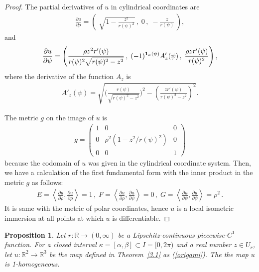 \documentclass{amsart}
\theoremstyle{plain}
\newtheorem{proposition}[theorem]{Proposition}
\theoremstyle{definition}
\theoremstyle{remark}
\begin{document}
\begin{proof}%
The partial derivatives of $u$ in cylindrical coordinates are
\begin{align*}
\frac{\partial u}{\partial\rho}=\left(\;\sqrt{1-\frac{z^2}{r(\psi)^2}}\,,\;0\,,\;-\frac{z}{r(\psi)}\,\right),
\end{align*}
and
\begin{align*}
\frac{\partial u}{\partial\psi}=\left(\frac{\rho z^2r'(\psi)}{r(\psi)^2\sqrt{r(\psi)^2-z^2}}\,,\;(-1)^{\bold{1}_{\kappa}(\psi)}A'_z(\psi)\,,\;\frac{\rho zr'(\psi)}{r(\psi)^2}\right),
\end{align*}
where the derivative of the function $A_z$ is
\begin{align*}
A'_z(\psi)=\sqrt{\biggl(\frac{r(\psi)}{\sqrt{r(\psi)^2-z^2}}\biggr)^2-\left(\frac{zr'(\psi)}{r(\psi)^2-z^2}\right)^2}.
\end{align*}

The metric $g$ on the image of $u$ is
\begin{align*}
g=\begin{pmatrix}1&0&0\\0&\rho^2\left(1- {z^2}/{r(\psi)^2}\right)&0\\0&0&1\end{pmatrix}
\end{align*}
because the codomain of $u$ was given in the cylindrical coordinate system.
Then, we have a calculation of the first fundamental form with the inner product in the metric $g$ as follows:
\begin{align*}
E=\left\langle\frac{\partial u}{\partial\rho},\frac{\partial u}{\partial\rho}\right\rangle=1\,,\;
F=\left\langle\frac{\partial u}{\partial\rho},\frac{\partial u}{\partial\psi}\right\rangle=0\,,\;
G=\left\langle\frac{\partial u}{\partial\psi},\frac{\partial u}{\partial\psi}\right\rangle=\rho^2\,.
\end{align*}
It is same with the metric of polar coordinates, hence $u$ is a local isometric immersion at all points at which $u$ is differentiable.
\end{proof}





\begin{proposition}\label{4.2} %
Let $r \colon \mathbb{R}\to(0,\infty)$ be a Lipschitz-continuous piecewise-$C^1$ function. 
For a closed interval $\kappa=[\alpha,\beta]\subset I=[0,2\pi)$ and a real number $z\in U_r$, let $u \colon \mathbb{R}^2\to\mathbb{R}^3$ be the map defined in Theorem~\ref{3.1} as (\ref{origami}).
The the map $u$ is 1-homogeneous. %
\end{proposition}
\end{document}
